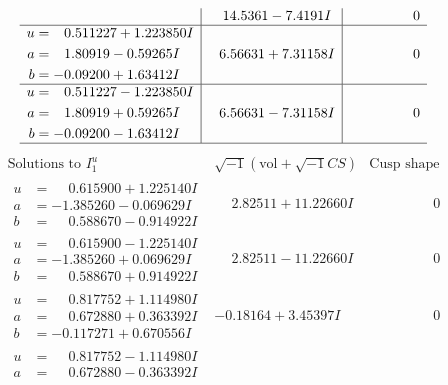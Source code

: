 \documentclass[1p]{elsarticle_modified}
\theoremstyle{definition}
\newcommand{\I}{\sqrt{-1}}
\begin{document}
$$\begin{array}{c|c|c}
 & \phantom{-}14.5361 - 7.4191 I & \phantom{-0.000000 } 0 \\ \hline\begin{aligned}
u &= \phantom{-}0.511227 + 1.223850 I \\
a &= \phantom{-}1.80919 - 0.59265 I \\
b &= -0.09200 + 1.63412 I\end{aligned}
 & \phantom{-}6.56631 + 7.31158 I & \phantom{-0.000000 } 0 \\ \hline\begin{aligned}
u &= \phantom{-}0.511227 - 1.223850 I \\
a &= \phantom{-}1.80919 + 0.59265 I \\
b &= -0.09200 - 1.63412 I\end{aligned}
 & \phantom{-}6.56631 - 7.31158 I & \phantom{-0.000000 } 0\\
 \hline 
 \end{array}$$\newpage$$\begin{array}{c|c|c}  
\text{Solutions to }I^u_{1}& \I (\text{vol} + \sqrt{-1}CS) & \text{Cusp shape}\\
 \hline 
\begin{aligned}
u &= \phantom{-}0.615900 + 1.225140 I \\
a &= -1.385260 - 0.069629 I \\
b &= \phantom{-}0.588670 - 0.914922 I\end{aligned}
 & \phantom{-}2.82511 + 11.22660 I & \phantom{-0.000000 } 0 \\ \hline\begin{aligned}
u &= \phantom{-}0.615900 - 1.225140 I \\
a &= -1.385260 + 0.069629 I \\
b &= \phantom{-}0.588670 + 0.914922 I\end{aligned}
 & \phantom{-}2.82511 - 11.22660 I & \phantom{-0.000000 } 0 \\ \hline\begin{aligned}
u &= \phantom{-}0.817752 + 1.114980 I \\
a &= \phantom{-}0.672880 + 0.363392 I \\
b &= -0.117271 + 0.670556 I\end{aligned}
 & -0.18164 + 3.45397 I & \phantom{-0.000000 } 0 \\ \hline\begin{aligned}
u &= \phantom{-}0.817752 - 1.114980 I \\
a &= \phantom{-}0.672880 - 0.363392 I \\

\end{aligned}
\end{array}$$
\end{document}
